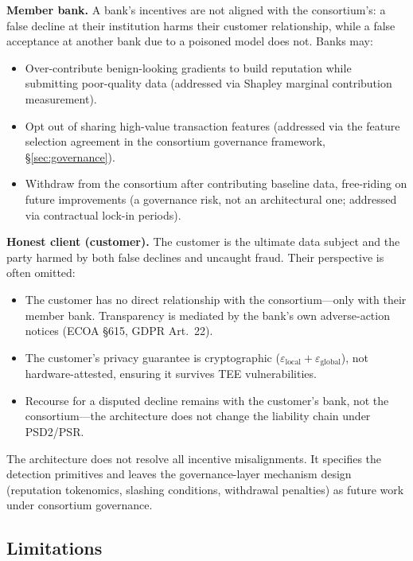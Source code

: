\documentclass[10pt,journal]{IEEEtran}
\begin{document}
\textbf{Member bank.} A bank's incentives are not aligned with the consortium's: a false decline at their institution harms their customer relationship, while a false acceptance at another bank due to a poisoned model does not. Banks may:
\begin{itemize}
  \item Over-contribute benign-looking gradients to build reputation while submitting poor-quality data (addressed via Shapley marginal contribution measurement).
  \item Opt out of sharing high-value transaction features (addressed via the feature selection agreement in the consortium governance framework, \S\ref{sec:governance}).
  \item Withdraw from the consortium after contributing baseline data, free-riding on future improvements (a governance risk, not an architectural one; addressed via contractual lock-in periods).
\end{itemize}

\textbf{Honest client (customer).} The customer is the ultimate data subject and the party harmed by both false declines and uncaught fraud. Their perspective is often omitted:
\begin{itemize}
  \item The customer has no direct relationship with the consortium---only with their member bank. Transparency is mediated by the bank's own adverse-action notices (ECOA \S615, GDPR Art.~22).
  \item The customer's privacy guarantee is cryptographic ($\varepsilon_{\text{local}} + \varepsilon_{\text{global}}$), not hardware-attested, ensuring it survives TEE vulnerabilities.
  \item Recourse for a disputed decline remains with the customer's bank, not the consortium---the architecture does not change the liability chain under PSD2/PSR.
\end{itemize}

The architecture does not resolve all incentive misalignments. It specifies the detection primitives and leaves the governance-layer mechanism design (reputation tokenomics, slashing conditions, withdrawal penalties) as future work under consortium governance.

\subsection{Limitations}
\end{document}

